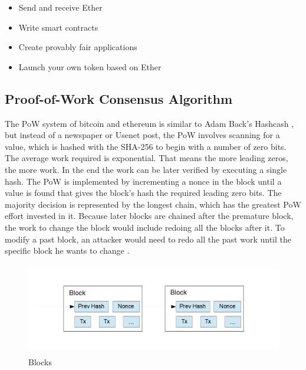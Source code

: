 \begin{itemize}
	\item Send and receive Ether
	\item Write smart contracts
	\item Create provably fair applications
	\item Launch your own token based on Ether
\end{itemize}

\clearpage

\subsection{Proof-of-Work Consensus Algorithm}
\label{subsec:background:first_section:second_subsection}


The \ac{PoW} system of bitcoin and ethereum is similar to Adam Back's Hashcash \cite{back2002hashcash}, but instead of a newspaper or Usenet post, the \ac{PoW} involves scanning for a value, which is hashed with the \ac{SHA-256} to begin with a number of zero bits. The average work required is exponential. That means the more leading zeros, the more work. In the end the work can be later verified by executing a single hash. The \ac{PoW} is implemented by incrementing a nonce in the block until a value is found that gives the block's hash the required leading zero bits. The majority decision is represented by the longest chain, which has the greatest \ac{PoW} effort invested in it. Because later blocks are chained after the premature block, the work to change the block would include redoing all the blocks after it. To modify a past block, an attacker would need to redo all the past work until the specific block he wants to change \cite{nakamoto2008peer}. 

\begin{figure}[h]
	\includegraphics[height=4cm]{blocks}
	\caption{Blocks}
	\label{fig:blocks}
\end{figure}

